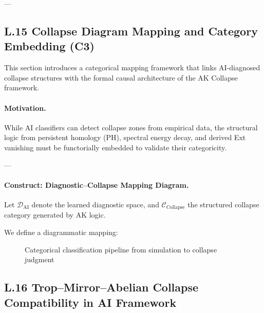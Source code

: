 \documentclass[11pt]{article}
\begin{document}
\begin{axiom}
\begin{axiom}
{{---

\subsection*{L.15 Collapse Diagram Mapping and Category Embedding (C3)}

This section introduces a categorical mapping framework that links AI-diagnosed collapse structures  
with the formal causal architecture of the AK Collapse framework.

\paragraph{Motivation.}
While AI classifiers can detect collapse zones from empirical data, the structural logic from persistent homology (PH),  
spectral energy decay, and derived Ext vanishing must be functorially embedded to validate their categoricity.

---

\paragraph{Construct: Diagnostic–Collapse Mapping Diagram.}

Let $\mathcal{D}_{\text{AI}}$ denote the learned diagnostic space,  
and $\mathcal{C}_{\text{Collapse}}$ the structured collapse category generated by AK logic.

We define a diagrammatic mapping:

\begin{figure}[htbp]
\centering

\caption{Categorical classification pipeline from simulation to collapse judgment}
\end{figure}

\subsection*{L.16 Trop–Mirror–Abelian Collapse Compatibility in AI Framework}

}}
\end{axiom}
\end{axiom}
\end{document}
